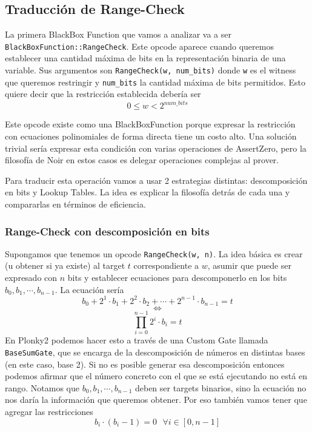 \subsection{Traducción de Range-Check}\label{sec:traduccion_range}
La primera BlackBox Function que vamos a analizar va a ser \texttt{BlackBoxFunction::RangeCheck}. Este opcode aparece cuando queremos establecer una cantidad máxima de bits en la representación binaria de una variable. Sus argumentos son \texttt{RangeCheck(w, num\_bits)} donde \texttt{w} es el witness que queremos restringir y \texttt{num\_bits} la cantidad máxima de bits permitidos. Esto quiere decir que la restricción establecida debería ser
$$0 \leq w < 2^{num\_bits}$$

Este opcode existe como una BlackBoxFunction porque expresar la restricción con ecuaciones polinomiales de forma directa tiene un costo alto. Una solución trivial sería expresar esta condición con varias operaciones de AssertZero, pero la filosofía de Noir en estos casos es delegar operaciones complejas al prover. 

Para traducir esta operación vamos a usar 2 estrategias distintas: descomposición en bits y Lookup Tables. La idea es explicar la filosofía detrás de cada una y compararlas en términos de eficiencia.

\subsubsection{\textbf{Range-Check con descomposición en bits}}\label{sec:range_check}
Supongamos que tenemos un opcode \texttt{RangeCheck(w, n)}. La idea básica es crear (u obtener si ya existe) al target $t$ correspondiente a $w$, asumir que puede ser expresado con $n$ bits y establecer ecuaciones para descomponerlo en los bits $b_0, b_1, \cdots, b_{n-1}$. La ecuación sería
$$b_0+2^1 \cdot b_1 + 2^2 \cdot b_2 + \cdots + 2^{n-1} \cdot b_{n-1} = t$$
$$\Longleftrightarrow$$
$$\prod_{i=0}^{n-1}2^i\cdot b_i = t$$
En Plonky2 podemos hacer esto a través de una Custom Gate llamada \texttt{BaseSumGate}, que se encarga de la descomposición de números en distintas bases (en este caso, base 2). Si no es posible generar esa descomposición entonces podemos afirmar que el número concreto con el que se está ejecutando no está en rango. Notamos que $b_0, b_1, \cdots, b_{n-1}$ deben ser targets binarios, sino la ecuación no nos daría la información que queremos obtener. Por eso también vamos tener que agregar las restricciones 
$$b_i \cdot (b_i - 1) = 0 ~~~ \forall i\in [0,n-1]$$


